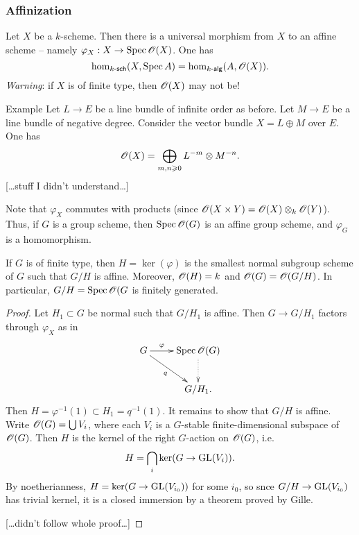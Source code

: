 \subsubsection{Affinization}

Let $X$ be a $k$-scheme. Then there is a universal morphism from $X$ to an affine 
scheme -- namely $\varphi_X:X \to \operatorname{Spec} \mathscr{O}(X)$. One has 
\[
  \hom_{k\textnormal{-}\mathsf{sch}}(X,\operatorname{Spec} A) = \hom_{k\textnormal{-}\mathsf{alg}}(A,\mathscr{O}(X)) .
\]
\emph{Warning}: if $X$ is of finite type, then $\mathscr{O}(X)$ may not be!

\begin{enonce}{Example}
Let $L\to E$ be a line bundle of infinite order as before. Let $M \to E$ be a 
line bundle of negative degree. Consider the vector bundle 
$X=L\oplus M$ over $E$. One has 
\[
  \mathscr{O}(X) = \bigoplus_{m,n\geqslant 0} L^{-m} \otimes M^{-n} .
\]
[\ldots stuff I didn't understand\ldots]
\end{enonce}

Note that $\varphi_X$ commutes with products (since 
$\mathscr{O}(X\times Y) = \mathscr{O}(X)\otimes_k \mathscr{O}(Y)$). Thus, if $G$ is a group scheme, then 
$\operatorname{Spec} \mathscr{O}(G)$ is an affine group scheme, and $\varphi_G$ is a homomorphism. 

\begin{theo}
If $G$ is of finite type, then $H=\ker(\varphi)$ is the smallest normal subgroup 
scheme of $G$ such that $G/H$ is affine. Moreover, $\mathscr{O}(H)=k$ and 
$\mathscr{O}(G)=\mathscr{O}(G/H)$. In particular, $G/H=\operatorname{Spec} \mathscr{O}(G$ is finitely generated. 
\end{theo}
\begin{proof}
Let $H_1\subset G$ be normal such that $G/H_1$ is affine. Then 
$G\to G/H_1$ factors through $\varphi_X$ as in 
\[\xymatrix{
  G \ar[r]^-\varphi \ar[dr]_-q 
    & \spectrum \sO(G) \ar@{.>}[d] \\
  & G/H_1 .
}\]
Then $H=\varphi^{-1}(1) \subset H_1=q^{-1}(1)$. It remains to show that $G/H$ is 
affine. Write $\mathscr{O}(G)=\bigcup V_i$, where each $V_i$ is a $G$-stable finite-dimensional 
subspace of $\mathscr{O}(G)$. Then $H$ is the kernel of the right $G$-action on 
$\mathscr{O}(G)$, i.e. 
\[
  H = \bigcap_i \ker(G \to \operatorname{GL}(V_i)) .
\]
By noetherianness, $H=\ker(G\to \operatorname{GL}(V_{i_0}))$ for some $i_0$, 
so snce $G/H \to \operatorname{GL}(V_{i_0})$ has trivial kernel, it is a 
closed immersion by a theorem proved by Gille. 

[\ldots didn't follow whole proof\ldots]
\end{proof}

